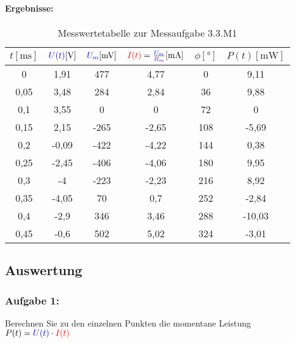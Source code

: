 \documentclass[11pt,a4paper,titlepage]{scrreprt}
\begin{document}
                   \paragraph{Ergebnisse:}
                   \begin{center}
                       \begin{table}[!hbtp]
                           \caption{Messwertetabelle zur Messaufgabe 3.3.M1}
                           \label{tbl:messergebnisse3.1}
                           \renewcommand{\arraystretch}{1.3}
                           \begin{center}
                               \begin{tabular}{c|ccccc}
									$t [\si{\milli\second}]$ & $\textcolor{blue}{U(t)} [\si{\volt}]$ & $\textcolor{blue}{U_m} [\si{\milli\volt}]$ & $\textcolor{red}{I(t)} = \frac{\textcolor{blue}{U_m}}{\textcolor{violet}{R_m}} [\si{\milli\ampere}]$ & $\phi [°]$ & $P(t) [\si{\milli\watt}]$\\ \hline
									0 & 1,91 & 477 & 4,77 & 0 & 9,11\\
									0,05 & 3,48 & 284 & 2,84 & 36 & 9,88\\
									0,1 & 3,55 & 0 & 0 & 72 & 0\\
									0,15 & 2,15 & -265 & -2,65 & 108 & -5,69\\
									0,2 & -0,09 & -422 & -4,22 & 144 & 0,38\\
									0,25 & -2,45 & -406 & -4,06 & 180 & 9,95\\
									0,3 & -4 & -223 & -2,23 & 216 & 8,92\\
									0,35 & -4,05 & 70 & 0,7 & 252 & -2,84\\
									0,4 & -2,9 & 346 & 3,46 & 288 & -10,03\\
									0,45 & -0,6 & 502 & 5,02 & 324 & -3,01\\
							   \end{tabular}
                           \end{center}
                       \end{table}
                   \end{center}
                   
                   
                   \subsection{Auswertung}
                   \subsubsection{Aufgabe 1:}  Berechnen Sie zu den einzelnen Punkten die momentane Leistung $P(t) = \textcolor{blue}{U(t)} \cdot \textcolor{red}{I(t)}$ 
                   
\end{document}
